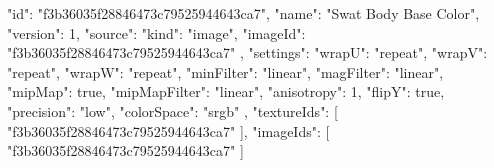 {
  "id": "f3b36035f28846473c79525944643ca7",
  "name": "Swat Body Base Color",
  "version": 1,
  "source": {
    "kind": "image",
    "imageId": "f3b36035f28846473c79525944643ca7"
  },
  "settings": {
    "wrapU": "repeat",
    "wrapV": "repeat",
    "wrapW": "repeat",
    "minFilter": "linear",
    "magFilter": "linear",
    "mipMap": true,
    "mipMapFilter": "linear",
    "anisotropy": 1,
    "flipY": true,
    "precision": "low",
    "colorSpace": "srgb"
  },
  "textureIds": [
    "f3b36035f28846473c79525944643ca7"
  ],
  "imageIds": [
    "f3b36035f28846473c79525944643ca7"
  ]
}
